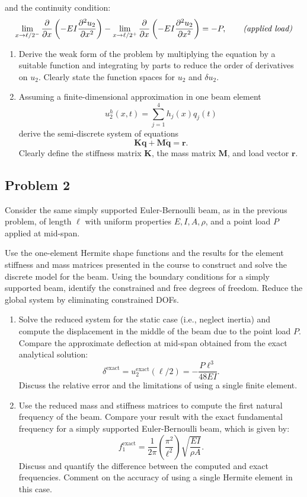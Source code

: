 \documentclass[12pt]{article}
\begin{document}
and the continuity condition:
\[
    \lim_{x\to\ell/2^-} \frac{\partial}{\partial x}\left(-EI\frac{\partial^2u_2}{\partial x^2}\right)-\lim_{x\to\ell/2^+} \frac{\partial}{\partial x}\left(-EI\frac{\partial^2u_2}{\partial x^2}\right)=-P, \qquad \text{\emph{(applied load)}}
\]
\begin{enumerate}
    \item Derive the weak form of the problem by multiplying the equation by a suitable function and integrating by parts to reduce the order of derivatives on $u_2$. Clearly state the function spaces for \( u_2 \) and \( \delta u_2\).
    \item Assuming a finite-dimensional approximation in one beam element
          $$u^h_2(x,t) = \sum_{j=1}^4 h_j(x) q_j(t)$$
          derive the semi-discrete system of equations
          $$\mathbf{K} \mathbf q+\mathbf{M}\ddot{\mathbf q} = \mathbf{r}.$$
          Clearly define the stiffness matrix \( \mathbf{K} \), the mass matrix \( \mathbf{M} \),  and load vector \( \mathbf{r} \).
\end{enumerate}



\subsection*{Problem 2}
Consider the same simply supported Euler-Bernoulli beam, as in the previous problem, of length \( \ell \) with uniform properties \( E, I, A, \rho \), and a point load \( P \) applied at mid-span.

Use the one-element Hermite shape functions and the results for the element stiffness and mass matrices presented in the course to construct and solve the discrete model for the beam. Using the boundary conditions for a simply supported beam, identify the constrained and free degrees of freedom. Reduce the global system by eliminating constrained DOFs.

\begin{enumerate}
    \item Solve the reduced system for the static case (i.e., neglect inertia) and compute the displacement in the middle of the beam due to the point load \( P \). Compare the approximate deflection at mid-span obtained from the exact analytical solution:
          \[
              \delta^\text{exact}=u_2^\text{exact}(\ell/2) = -\frac{P \ell^3}{48 EI}.
          \]
          Discuss the relative error and the limitations of using a single finite element.

    \item Use the reduced mass and stiffness matrices to compute the first natural frequency of the beam. Compare your result with the exact fundamental frequency for a simply supported Euler-Bernoulli beam, which is given by:
          \[
              f_1^\text{exact} = \frac{1}{2\pi} \left(\frac{\pi^2}{\ell^2}\right) \sqrt{\frac{EI}{\rho A}}.
          \]
          Discuss and quantify the difference between the computed and exact frequencies. Comment on the accuracy of using a single Hermite element in this case.
\end{enumerate}
\end{document}
